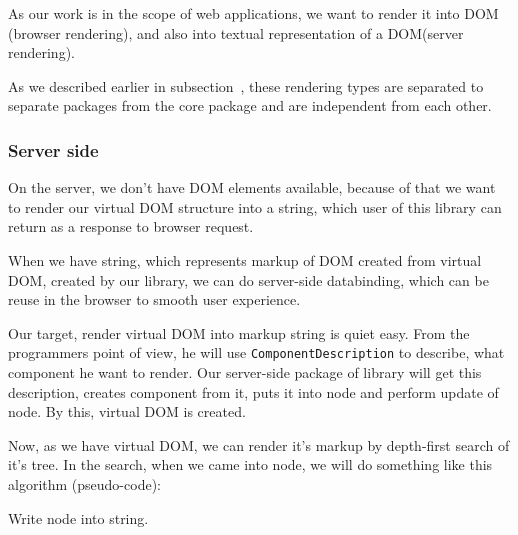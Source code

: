     As our work is in the scope of web applications, we want to render it into DOM (browser rendering), 
    and also into textual representation of a DOM(server rendering).

    As we described earlier in subsection~, 
    these rendering types are separated to separate packages from the core package and are independent from each other. 

    \subsubsection{Server side}\label{subsec:our-architecture-rendering-server}
      On the server, we don't have DOM elements available, 
      because of that we want to render our virtual DOM structure into a string,
      which user of this library can return as a response to browser request.

      When we have string, which represents markup of DOM created from virtual DOM, 
      created by our library, we can do server-side databinding, 
      which can be reuse in the browser to smooth user experience. 

      Our target, render virtual DOM into markup string is quiet easy.
      From the programmers point of view, he will use \texttt{ComponentDescription} to describe, 
      what component he want to render. 
      Our server-side package of library will get this description, creates component from it, 
      puts it into node and perform update of node. 
      By this, virtual DOM is created. 

      Now, as we have virtual DOM, we can render it's markup by depth-first search of it's tree. 
      In the search, when we came into node, we will do something like this algorithm (pseudo-code):
      \begin{algorithm}[H]
        \caption{Write node into string.}
      \end{algorithm}

